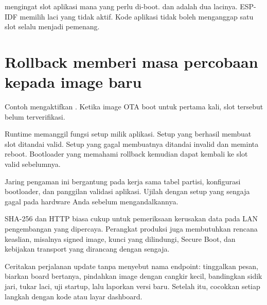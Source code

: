  mengingat slot aplikasi mana yang perlu di-boot.  dan  adalah dua lacinya. ESP-IDF memilih laci yang tidak aktif. Kode aplikasi tidak boleh menganggap satu slot selalu menjadi pemenang.

\section{Rollback memberi masa percobaan kepada image baru}

Contoh mengaktifkan . Ketika image OTA boot untuk pertama kali, slot tersebut belum terverifikasi.

Runtime memanggil fungsi setup milik aplikasi. Setup yang berhasil membuat slot ditandai valid. Setup yang gagal membuatnya ditandai invalid dan meminta reboot. Bootloader yang memahami rollback kemudian dapat kembali ke slot valid sebelumnya.

Jaring pengaman ini bergantung pada kerja sama tabel partisi, konfigurasi bootloader, dan panggilan validasi aplikasi. Ujilah dengan setup yang sengaja gagal pada hardware Anda sebelum mengandalkannya.

\begin{warningbox}
SHA-256 dan HTTP biasa cukup untuk pemeriksaan kerusakan data pada LAN pengembangan yang dipercaya. Perangkat produksi juga membutuhkan rencana keaslian, misalnya signed image, kunci yang dilindungi, Secure Boot, dan kebijakan transport yang dirancang dengan sengaja.
\end{warningbox}

\begin{checkpoint}
Ceritakan perjalanan update tanpa menyebut nama endpoint: tinggalkan pesan, biarkan board bertanya, pindahkan image dengan cangkir kecil, bandingkan sidik jari, tukar laci, uji startup, lalu laporkan versi baru. Setelah itu, cocokkan setiap langkah dengan kode atau layar dashboard.
\end{checkpoint}
